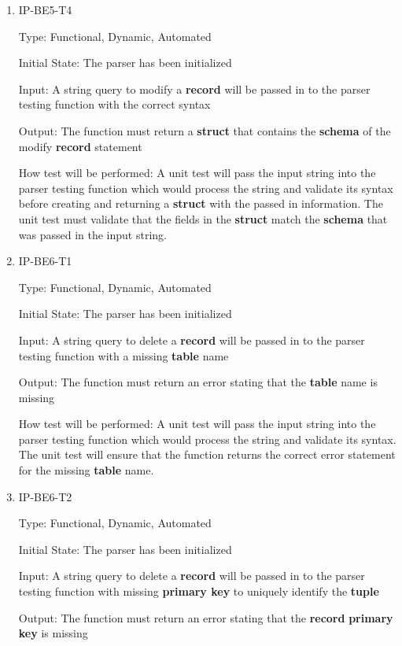 \documentclass[12pt, titlepage]{article}
\begin{document}
\begin{enumerate}
\item{IP-BE5-T4}

Type: Functional, Dynamic, Automated
					
Initial State: The parser has been initialized
					
Input: A string query to modify a \textbf{record} will be passed in to the parser testing function with the correct syntax
					
Output: The function must return a \textbf{struct} that contains the \textbf{schema} of the modify \textbf{record} statement
					
How test will be performed: A unit test will pass the input string into the parser testing function which would process the string and validate its syntax before creating and returning a \textbf{struct} with the passed in information. The unit test must validate that the fields in the \textbf{struct} match the \textbf{schema} that was passed in the input string.

\item{IP-BE6-T1}

Type: Functional, Dynamic, Automated
					
Initial State: The parser has been initialized
					
Input: A string query to delete a \textbf{record} will be passed in to the parser testing function with a missing \textbf{table} name
					
Output: The function must return an error stating that the \textbf{table} name is missing
					
How test will be performed: A unit test will pass the input string into the parser testing function which would process the string and validate its syntax. The unit test will ensure that the function returns the correct error statement for the missing \textbf{table} name.

\item{IP-BE6-T2}

Type: Functional, Dynamic, Automated
					
Initial State: The parser has been initialized
					
Input: A string query to delete a \textbf{record} will be passed in to the parser testing function with missing \textbf{primary key} to uniquely identify the \textbf{tuple}
					
Output: The function must return an error stating that the \textbf{record} \textbf{primary key} is missing
					

\end{enumerate}
\end{document}
